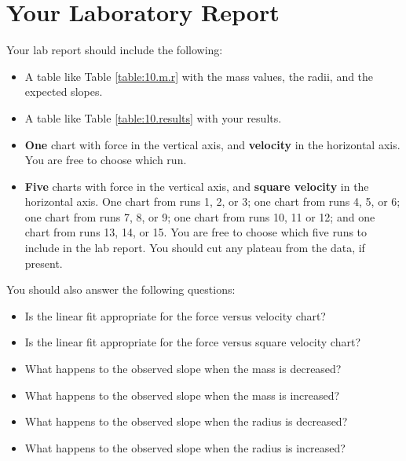 \section{Your Laboratory Report}
%
Your lab report should include the following:
\begin{itemize}
    \item A table like Table \ref{table:10.m.r} with the mass values, the radii, and the expected slopes.
    \item A table like Table \ref{table:10.results} with your results.
    \item \textbf{One} chart with force in the vertical axis, and \textbf{velocity} in the horizontal axis. You are free to choose which run.
    \item \textbf{Five} charts with force in the vertical axis, and \textbf{square velocity} in the horizontal axis. One chart from runs 1, 2, or 3; one chart from runs 4, 5, or 6; one chart from runs 7, 8, or 9; one chart from runs 10, 11 or 12; and one chart from runs 13, 14, or 15. You are free to choose which five runs to include in the lab report. You should cut any plateau from the data, if present.
\end{itemize}
You should also answer the following questions:
\begin{itemize}
    \item Is the linear fit appropriate for the force versus velocity chart?
    \item Is the linear fit appropriate for the force versus square velocity chart?
    \item What happens to the observed slope when the mass is decreased?
    \item What happens to the observed slope when the mass is increased?
    \item What happens to the observed slope when the radius is decreased?
    \item What happens to the observed slope when the radius is increased?
\end{itemize}
%
\newpage
